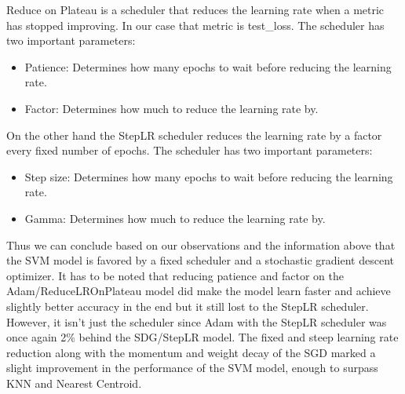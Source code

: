 Reduce on Plateau is a scheduler that reduces the learning rate when a metric has 
stopped improving. In our case that metric is test\_loss. The scheduler has two 
important parameters:
\begin{itemize}
    \item Patience: Determines how many epochs to wait before reducing the learning 
    rate. 
    \item Factor: Determines how much to reduce the learning rate by.
\end{itemize}
On the other hand the StepLR scheduler reduces the learning rate by a factor every
fixed number of epochs. The scheduler has two important parameters:
\begin{itemize}
    \item Step size: Determines how many epochs to wait before reducing the learning 
    rate.
    \item Gamma: Determines how much to reduce the learning rate by.
\end{itemize}

Thus we can conclude based on our observations and the information above that the
SVM model is favored by a fixed scheduler and a stochastic gradient descent optimizer.
It has to be noted that reducing patience and factor on the Adam/ReduceLROnPlateau 
model did make the model learn faster and achieve slightly better accuracy in the end 
but it still lost to the StepLR scheduler. However, it isn't just the scheduler since 
Adam with the StepLR scheduler was once again 2\% behind the SDG/StepLR model. The 
fixed and steep learning rate reduction along with the momentum and weight decay
of the SGD marked a slight improvement in the performance of the SVM model, enough
to surpass KNN and Nearest Centroid.
